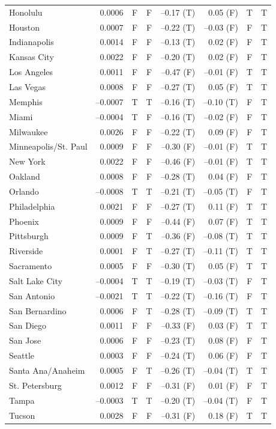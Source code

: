 \documentclass[
  12pt,
]{interact}
\begin{document}
\begin{table}
{{\begin{tabular}{lrccrrcc}
Honolulu & 0.0006 & F & F & --0.17 (T) & 0.05 (F) & T & T\\
Houston & 0.0007 & F & F & --0.22 (T) & --0.03 (F) & F & T\\
Indianapolis & 0.0014 & F & F & --0.13 (T) & 0.02 (F) & F & T\\
\addlinespace
Kansas City & 0.0022 & F & F & --0.20 (T) & 0.02 (F) & F & T\\
Los Angeles & 0.0011 & F & F & --0.47 (F) & --0.01 (F) & T & T\\
Las Vegas & 0.0008 & F & F & --0.27 (T) & 0.05 (F) & T & T\\
Memphis & --0.0007 & T & T & --0.16 (T) & --0.10 (T) & F & T\\
Miami & --0.0004 & T & F & --0.16 (T) & --0.02 (F) & F & T\\
\addlinespace
Milwaukee & 0.0026 & F & F & --0.22 (T) & 0.09 (F) & F & T\\
Minneapolis/St. Paul & 0.0009 & F & F & --0.30 (F) & --0.01 (F) & T & T\\
New York & 0.0022 & F & F & --0.46 (F) & --0.01 (F) & T & T\\
Oakland & 0.0008 & F & F & --0.28 (T) & 0.04 (F) & F & T\\
Orlando & --0.0008 & T & T & --0.21 (T) & --0.05 (T) & F & T\\
\addlinespace
Philadelphia & 0.0021 & F & F & --0.27 (T) & 0.11 (F) & T & T\\
Phoenix & 0.0009 & F & F & --0.44 (F) & 0.07 (F) & T & T\\
Pittsburgh & 0.0009 & F & T & --0.36 (F) & --0.08 (T) & T & T\\
Riverside & 0.0001 & F & T & --0.27 (T) & --0.11 (T) & T & T\\
Sacramento & 0.0005 & F & F & --0.30 (T) & 0.05 (F) & T & T\\
\addlinespace
Salt Lake City & --0.0004 & T & T & --0.19 (T) & --0.03 (T) & F & T\\
San Antonio & --0.0021 & T & T & --0.22 (T) & --0.16 (T) & F & T\\
San Bernardino & 0.0006 & F & T & --0.28 (T) & --0.09 (T) & T & T\\
San Diego & 0.0011 & F & F & --0.33 (F) & 0.03 (F) & T & T\\
San Jose & 0.0006 & F & F & --0.23 (T) & 0.08 (F) & F & T\\
\addlinespace
Seattle & 0.0003 & F & F & --0.24 (T) & 0.06 (F) & F & T\\
Santa Ana/Anaheim & 0.0005 & F & T & --0.26 (T) & --0.04 (T) & T & T\\
St. Petersburg & 0.0012 & F & F & --0.31 (F) & 0.01 (F) & F & T\\
Tampa & --0.0003 & T & T & --0.20 (T) & --0.04 (T) & F & T\\
Tucson & 0.0028 & F & F & --0.31 (F) & 0.18 (F) & T & T\\
\bottomrule
\end{tabular}}

}

\end{table}%
\end{document}
